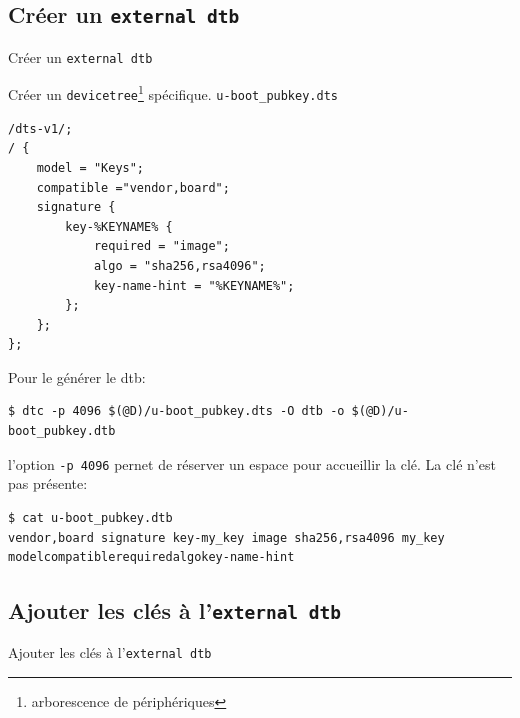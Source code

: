 \documentclass[aspectratio=169]{beamer}
\begin{document}

\subsection{Créer un \texttt{external dtb}}

\begin{frame}
\begin{center}
\large{Créer un \texttt{external dtb}}
\end{center}
\end{frame}

\begin{frame}[fragile]
Créer un \texttt{devicetree}\footnote{arborescence de périphériques} spécifique.
\texttt{u-boot\_pubkey.dts}
\begin{lstlisting}
/dts-v1/;
/ {
	model = "Keys";
	compatible ="vendor,board";
	signature {
		key-%KEYNAME% {
			required = "image";
			algo = "sha256,rsa4096";
			key-name-hint = "%KEYNAME%";
		};
	};
};
\end{lstlisting}
\end{frame}

\begin{frame}[fragile]
Pour le générer le dtb:
\begin{lstlisting}[style=shell]
$ dtc -p 4096 $(@D)/u-boot_pubkey.dts -O dtb -o $(@D)/u-boot_pubkey.dtb
\end{lstlisting}
l'option \texttt{-p 4096} pernet de réserver un espace pour accueillir la clé.\newline
\newline
La clé n'est pas présente:
\begin{lstlisting}[style=shell]
$ cat u-boot_pubkey.dtb
vendor,board signature key-my_key image sha256,rsa4096 my_key modelcompatiblerequiredalgokey-name-hint
\end{lstlisting}
\end{frame}


\subsection{Ajouter les clés à l'\texttt{external dtb}}

\begin{frame}
\begin{center}
\large{Ajouter les clés à l'\texttt{external dtb}}
\end{center}
\end{frame}
\end{document}
